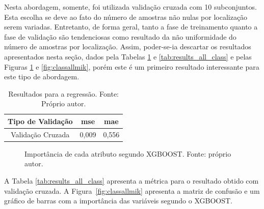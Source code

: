 Nesta abordagem, somente, foi utilizada validação cruzada com 10 subconjuntos. Esta escolha se deve ao fato do número de amostras não nulas por localização serem variadas. Entretanto, de forma geral, tanto a fase de treinamento quanto a fase de validação são tendenciosas como resultado da não uniformidade do número de amostras por localização. Assim, poder-se-ia descartar os resultados apresentados nesta seção, dados pela Tabelas \ref{tab:results_all_reg} e \ref{tab:results_all_class}  e pelas Figuras \ref{fig:regall} e \ref{fig:classallmik}, porém este é um primeiro resultado interessante para este tipo de abordagem.

\begin{table}[H]
\begin{center}
\begin{tabular}{|c|c|c|}
\hline
Tipo de Validação & mse       & mae   \\ \hline
Validação Cruzada                   & 0,009   & 0,556  \\ \hline
\end{tabular}
\end{center}
\vspace{12pt}
\caption{Resultados para a regressão. Fonte: Próprio autor.}
\label{tab:results_all_reg}
\end{table}

\begin{figure}[H]
\center
{}
\caption{Importância de cada atributo segundo XGBOOST. Fonte: próprio autor.}\label{fig:regall}
\end{figure}

A Tabela \ref{tab:results_all_class} apresenta a métrica para o resultado obtido com validação cruzada. A Figura\ \ref{fig:classallmik} apresenta a matriz de confusão e um gráfico de barras com a importância das variáveis segundo o XGBOOST.

